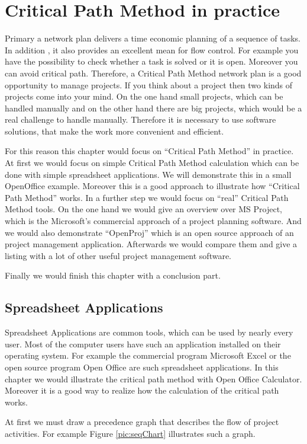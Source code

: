 \section{Critical Path Method in practice}\label{sec:inthefield}
Primary a network plan delivers a time economic planning of a sequence of tasks. In addition , it also provides an excellent mean for flow control. For example you have the possibility to check whether a task is solved or it is open. Moreover you can avoid critical path. Therefore, a Critical Path Method network plan is a good opportunity to manage projects. If you think about a project then two kinds of projects come into your mind. On the one hand small projects, which can be handled manually and on the other hand there are big projects, which would be a real challenge to handle manually. Therefore it is necessary to use software solutions, that make the work more convenient and efficient. 

For this reason this chapter would focus on “Critical Path Method” in practice. At first we would focus on simple Critical Path Method calculation which can be done with simple spreadsheet applications. We will demonstrate this in a small OpenOffice example. Moreover this is a good approach to illustrate how “Critical Path Method” works.
In a further step we would focus on “real” Critical Path Method tools. On the one hand we would give an overview over MS Project, which is the Microsoft's commercial approach of a project planning software. And we would also demonstrate “OpenProj” which is an open source approach of an project management application. Afterwards we would compare them and give a listing with a lot of other useful project management software.

Finally we would finish this chapter with a conclusion part.

\subsection{Spreadsheet Applications}
Spreadsheet Applications are common tools, which can be used by nearly every user. Most of the computer users have such an application installed on their operating system. For example the commercial program Microsoft Excel or the open source program Open Office are such spreadsheet applications. In this chapter we would illustrate the critical path method with Open Office Calculator. Moreover it is a good way to realize how the calculation of the critical path works.

At first we must draw a precedence graph that describes the flow of project activities. For example Figure \ref{pic:seqChart}  illustrates such a graph. 

